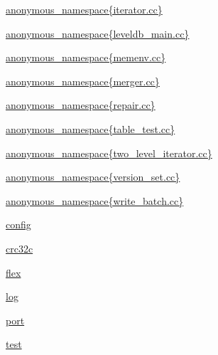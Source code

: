 \begin{DoxyCompactItemize}
\item 
 \hyperlink{namespaceleveldb_1_1anonymous__namespace_02iterator_8cc_03}{anonymous\+\_\+namespace\{iterator.\+cc\}}
\item 
 \hyperlink{namespaceleveldb_1_1anonymous__namespace_02leveldb__main_8cc_03}{anonymous\+\_\+namespace\{leveldb\+\_\+main.\+cc\}}
\item 
 \hyperlink{namespaceleveldb_1_1anonymous__namespace_02memenv_8cc_03}{anonymous\+\_\+namespace\{memenv.\+cc\}}
\item 
 \hyperlink{namespaceleveldb_1_1anonymous__namespace_02merger_8cc_03}{anonymous\+\_\+namespace\{merger.\+cc\}}
\item 
 \hyperlink{namespaceleveldb_1_1anonymous__namespace_02repair_8cc_03}{anonymous\+\_\+namespace\{repair.\+cc\}}
\item 
 \hyperlink{namespaceleveldb_1_1anonymous__namespace_02table__test_8cc_03}{anonymous\+\_\+namespace\{table\+\_\+test.\+cc\}}
\item 
 \hyperlink{namespaceleveldb_1_1anonymous__namespace_02two__level__iterator_8cc_03}{anonymous\+\_\+namespace\{two\+\_\+level\+\_\+iterator.\+cc\}}
\item 
 \hyperlink{namespaceleveldb_1_1anonymous__namespace_02version__set_8cc_03}{anonymous\+\_\+namespace\{version\+\_\+set.\+cc\}}
\item 
 \hyperlink{namespaceleveldb_1_1anonymous__namespace_02write__batch_8cc_03}{anonymous\+\_\+namespace\{write\+\_\+batch.\+cc\}}
\item 
 \hyperlink{namespaceleveldb_1_1config}{config}
\item 
 \hyperlink{namespaceleveldb_1_1crc32c}{crc32c}
\item 
 \hyperlink{namespaceleveldb_1_1flex}{flex}
\item 
 \hyperlink{namespaceleveldb_1_1log}{log}
\item 
 \hyperlink{namespaceleveldb_1_1port}{port}
\item 
 \hyperlink{namespaceleveldb_1_1test}{test}
\end{DoxyCompactItemize}
